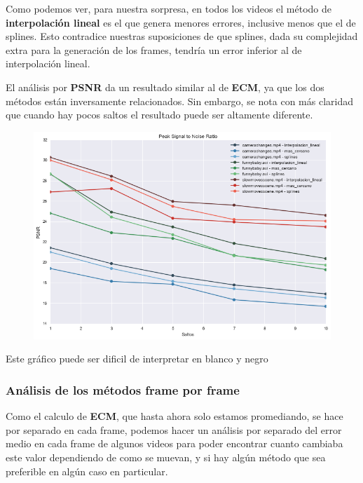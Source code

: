 Como podemos ver, para nuestra sorpresa, en todos los videos el m\'etodo de \textbf{interpolaci\'on
lineal} es el que genera menores errores, inclusive menos que el de splines. Esto contradice nuestras
suposiciones de que splines, dada su complejidad extra para la generaci\'on de los frames, tendr\'ia 
un error inferior al de interpolaci\'on lineal.

El an\'alisis por \textbf{PSNR} da un resultado similar al de \textbf{ECM}, ya
que los dos m\'etodos est\'an inversamente relacionados. Sin embargo, se nota
con m\'as claridad que cuando hay pocos saltos el resultado puede ser altamente
diferente.

\begin{figure}[H]
\centering
\includegraphics[width=.95\textwidth]{graficos/psnr.png}
\end{figure}
\vspace{-2em}
\begin{tiny}Este gr\'afico puede ser dificil de interpretar en blanco y negro\end{tiny}
\vspace{2em}

\subsubsection{An\'alisis de los m\'etodos frame por frame}

Como el calculo de \textbf{ECM}, que hasta ahora solo estamos promediando, se
hace por separado en cada frame, podemos hacer un an\'alisis por separado del
error medio en cada frame de algunos videos para poder encontrar cuanto cambiaba
este valor dependiendo de como se muevan, y si hay alg\'un m\'etodo que sea
preferible en alg\'un caso en particular.

